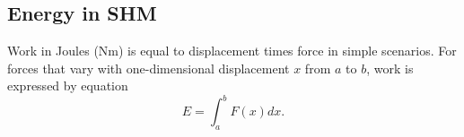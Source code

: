 \documentclass{article}
\begin{document}
\subsection{Energy in SHM}
\begin{definition}
	Work in Joules (Nm) is equal to displacement times force in simple scenarios. For forces that vary with one-dimensional displacement \(x\) from \(a\) to \(b\), work is expressed by equation
	\begin{equation*}
		E=\int_a^b F(x)dx.
	\end{equation*}
\end{definition}
\end{document}
